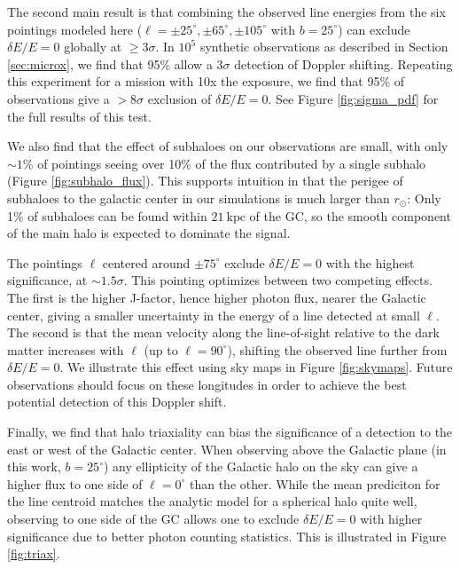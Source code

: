\documentclass[aps,prd,10pt,twocolumn,superscriptaddress,showpacs,footinbib]{revtex4-1}
\newcommand{\units}[1]{~\mathrm{#1}}
\begin{document}
The second main result is that combining the observed line energies from the six pointings modeled
here ($\ell=\pm25^\circ,\pm65^\circ,\pm105^\circ$ with $b=25^\circ$) can exclude
$\delta E/E = 0$ globally at $\geq 3\sigma$. In $10^5$ synthetic observations as described in
Section \ref{sec:microx}, we find that 95\% allow a $3\sigma$ detection of Doppler shifting. Repeating this
experiment for a mission with 10x the exposure, we find that 95\% of observations give a $>8\sigma$
exclusion of $\delta E/E = 0$. See Figure \ref{fig:sigma_pdf} for the full results of this test.

We also find that the effect of subhaloes on our observations are small,
with only $\sim1\%$ of pointings seeing over 10\% of the flux contributed by a single subhalo
(Figure \ref{fig:subhalo_flux}). This supports intuition in that the perigee of subhaloes to the
galactic center in our
simulations is much larger than $r_\odot$: Only 1\% of subhaloes can be found within
$21\units{kpc}$ of the GC, so the smooth component of the main halo is expected to dominate
the signal.

The pointings $\ell$ centered around $\pm75^\circ$ exclude $\delta E/E=0$ with 
the highest significance, at $\sim 1.5\sigma$.  This pointing optimizes between two
competing effects. The first is the higher J-factor, hence higher
photon flux, nearer the Galactic center, giving a smaller uncertainty in the energy of a line
detected at small $\ell$. The second is that the mean velocity along the line-of-sight relative to
the dark matter increases with $\ell$ (up to $\ell=90^\circ$), shifting the observed line further
from $\delta E/E=0$. We illustrate this effect using sky maps in Figure \ref{fig:skymaps}.
Future observations should focus on these longitudes
in order to achieve the best potential detection of this Doppler shift.

Finally, we find that halo triaxiality can bias the significance of a detection to
the east or west of the Galactic center. When observing above the Galactic plane (in this work,
$b=25^\circ$) any ellipticity of the Galactic halo on the sky can give a higher flux to one side of
$\ell=0^\circ$ than the other. While the mean prediciton for the line centroid matches the analytic model
for a spherical halo quite well, observing to one side of the GC allows one to exclude $\delta
E/E=0$ with higher significance due to better photon counting statistics. This is illustrated in
Figure \ref{fig:triax}. 
\end{document}
